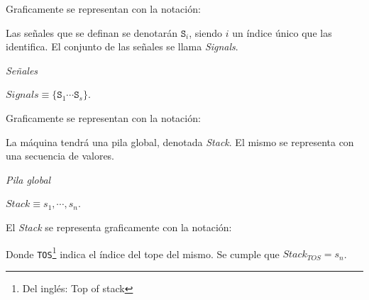   Graficamente se representan con la notación:

  

  Las señales que se definan se denotarán $\texttt{S}_i$, siendo $i$ un
  índice único que las identifica. El conjunto de las señales se llama
  \textit{Signals}.

\begin{definicion}
  \textit{Señales}
  \begin{center}
    $\textit{Signals} \equiv \{\texttt{S}_1 \dotsb \texttt{S}_s\}$.
  \end{center}
\end{definicion}

  Graficamente se representan con la notación:

  

  La máquina tendrá una pila global, denotada \textit{Stack}. El mismo
  se representa con una secuencia de valores.

\begin{definicion}
  \textit{Pila global}
  \begin{center}
    $\textit{Stack} \equiv s_1, \dotsb, s_n$.
  \end{center}
\end{definicion}

  El \textit{Stack} se representa graficamente con la notación:

  

  Donde \texttt{TOS}\footnote{Del inglés: Top
  of stack} indica el índice del tope del mismo.
  Se cumple que $\textit{Stack}_{TOS} = s_n$.
